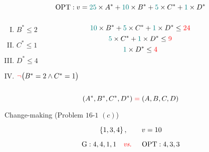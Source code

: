 \begin{frame}{}
  \[
    \text{OPT}: v = \textcolor{teal}{25} \times A^{\ast} + \textcolor{teal}{10} \times B^{\ast} + \textcolor{teal}{5} \times C^{\ast} + \textcolor{teal}{1} \times D^{\ast}
  \]

  \vspace{0.50cm}
  \begin{columns}
      \pause
      \begin{lemma}
	\begin{enumerate}[(I)]
	  \item $B^{\ast} \le 2$
	  \item $C^{\ast} \le 1$
	  \item $D^{\ast} \le 4$
	  \item $\textcolor{red}{\lnot} \big(B^{\ast} = 2 \land C^{\ast} = 1\big)$
	\end{enumerate}
      \end{lemma}
      \pause
      \begin{theorem}
	\[
	  \textcolor{teal}{10} \times B^{\ast} + \textcolor{teal}{5} \times C^{\ast} + \textcolor{teal}{1} \times D^{\ast} \le \textcolor{red}{24}
	\]
	\[
	  \textcolor{teal}{5} \times C^{\ast} + \textcolor{teal}{1} \times D^{\ast} \le \textcolor{red}{9}
	\]
	\[
	  \textcolor{teal}{1} \times D^{\ast} \le \textcolor{red}{4}
	\]
      \end{theorem}
  \end{columns}

  \pause
  \vspace{0.80cm}
  \[
    (A^{\ast}, B^{\ast}, C^{\ast}, D^{\ast}) \;\textcolor{red}{=}\; (A, B, C, D)
  \]
\end{frame}

\begin{frame}{}
  \begin{exampleblock}{Change-making (Problem $16$-$1$ $(c)$)}

    \pause
    \[
      \left\{1, 3, 4\right\}, \qquad v = 10
    \]

    \pause
    \[
      \text{G}: 4, 4, 1, 1 \quad \text{\textcolor{red}{\it vs. }} \quad \text{OPT}: 4, 3, 3
    \]
  \end{exampleblock}

  \pause
  \vspace{0.30cm}
  \begin{quote}
    \centering
  \end{quote}
\end{frame}

